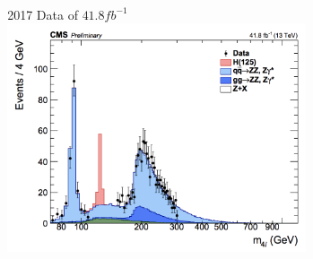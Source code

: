 \documentclass[xcolor={usenames,dvipsnames,svgnames,table}]{beamer}
\begin{document}
\begin{frame}
\begin{columns}
\begin{column}{0.49\textwidth}
\begin{figure}[t]
		\end{figure}
	\end{column}
	\begin{column}{0.49\textwidth}
		\begin{figure}[t]
			\\
			\vspace{-0.5cm}
			\centering \textcolor{color1}{2017 Data of $41.8 fb^{-1}$}\\
			\includegraphics[width=0.9\textwidth]{plots/2017_goldenchannel.png}
		\end{figure}
	\end{column}
	\end{columns}
\end{frame}
\end{document}
